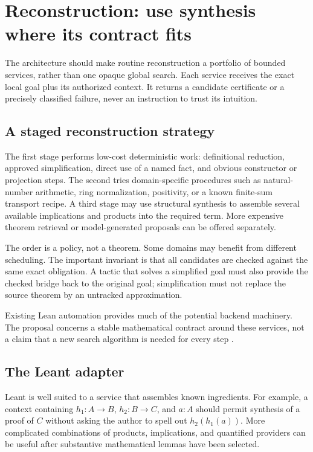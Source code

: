 \documentclass[11pt,a4paper]{article}
\theoremstyle{remark}
\begin{document}
\section{Reconstruction: use synthesis where its contract fits}
\label{sec:synthesis}
The architecture should make routine reconstruction a portfolio of bounded services, rather than one opaque global search. Each service receives the exact local goal plus its authorized context. It returns a candidate certificate or a precisely classified failure, never an instruction to trust its intuition.

\subsection{A staged reconstruction strategy}
The first stage performs low-cost deterministic work: definitional reduction, approved simplification, direct use of a named fact, and obvious constructor or projection steps. The second tries domain-specific procedures such as natural-number arithmetic, ring normalization, positivity, or a known finite-sum transport recipe. A third stage may use structural synthesis to assemble several available implications and products into the required term. More expensive theorem retrieval or model-generated proposals can be offered separately.

The order is a policy, not a theorem. Some domains may benefit from different scheduling. The important invariant is that all candidates are checked against the same exact obligation. A tactic that solves a simplified goal must also provide the checked bridge back to the original goal; simplification must not replace the source theorem by an untracked approximation.

Existing Lean automation provides much of the potential backend machinery. The proposal concerns a stable mathematical contract around these services, not a claim that a new search algorithm is needed for every step \cite{aesop,grind}.

\subsection{The Leant adapter}
Leant is well suited to a service that assembles known ingredients. For example, a context containing $h_1:A\to B$, $h_2:B\to C$, and $a:A$ should permit synthesis of a proof of $C$ without asking the author to spell out $h_2(h_1(a))$. More complicated combinations of products, implications, and quantified providers can be useful after substantive mathematical lemmas have been selected.
\end{document}
